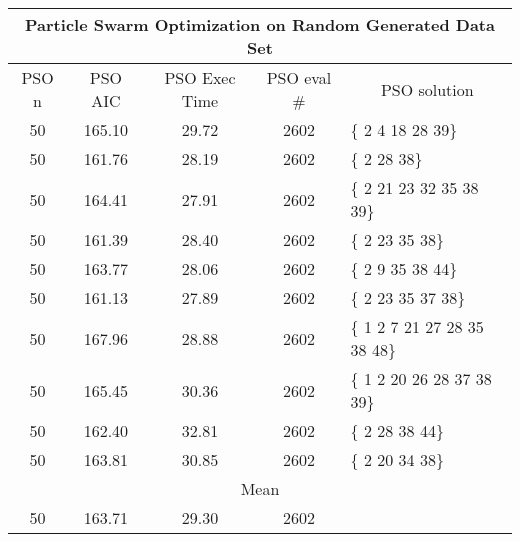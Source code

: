 \begin{tabular}{|c|c|c|c|l|}
	\hline
	\multicolumn{5}{|c|}{Particle Swarm Optimization on Random Generated Data Set}                        \\ \hline
	PSO n & PSO AIC     & PSO Exec Time & PSO eval \# & \multicolumn{1}{c|}{PSO solution} \\ \hline
	50    & 165.10 & 29.72             & 2602                   & \{ 2 4 18 28 39\}                 \\ \hline
	50    & 161.76 & 28.19             & 2602                   & \{ 2 28 38\}                      \\ \hline
	50    & 164.41 & 27.91             & 2602                   & \{ 2 21 23 32 35 38 39\}          \\ \hline
	50    & 161.39 & 28.40             & 2602                   & \{ 2 23 35 38\}                   \\ \hline
	50    & 163.77 & 28.06             & 2602                   & \{ 2 9 35 38 44\}                 \\ \hline
	50    & 161.13 & 27.89             & 2602                   & \{ 2 23 35 37 38\}                \\ \hline
	50    & 167.96 & 28.88             & 2602                   & \{ 1 2 7 21 27 28 35 38 48\}      \\ \hline
	50    & 165.45 & 30.36             & 2602                   & \{ 1 2 20 26 28 37 38 39\}        \\ \hline
	50    & 162.40 & 32.81             & 2602                   & \{ 2 28 38 44\}                   \\ \hline
	50    & 163.81 & 30.85             & 2602                   & \{ 2 20 34 38\}                   \\ \hline
	\multicolumn{5}{|c|}{Mean}                                                                            \\ \hline
	50    & 163.71 & 29.30            & 2602                   &                                   \\ \hline
\end{tabular}
